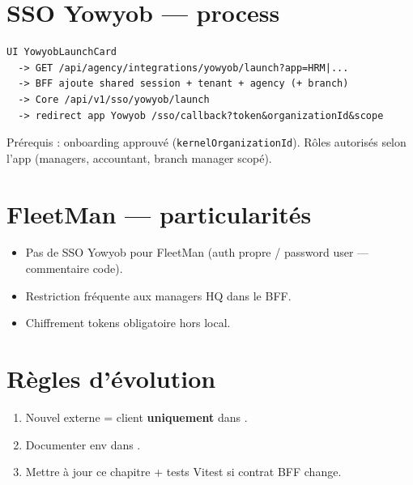 \section{SSO Yowyob --- process}

\begin{lstlisting}
UI YowyobLaunchCard
  -> GET /api/agency/integrations/yowyob/launch?app=HRM|...
  -> BFF ajoute shared session + tenant + agency (+ branch)
  -> Core /api/v1/sso/yowyob/launch
  -> redirect app Yowyob /sso/callback?token&organizationId&scope
\end{lstlisting}

Prérequis : onboarding approuvé (\texttt{kernelOrganizationId}). Rôles autorisés
selon l'app (managers, accountant, branch manager scopé).

\section{FleetMan --- particularités}

\begin{itemize}
  \item Pas de SSO Yowyob pour FleetMan (auth propre / password user --- commentaire code).
  \item Restriction fréquente aux managers HQ dans le BFF.
  \item Chiffrement tokens obligatoire hors local.
\end{itemize}

\section{Règles d'évolution}

\begin{enumerate}
  \item Nouvel externe = client \textbf{uniquement} dans .
  \item Documenter env dans .
  \item Mettre à jour ce chapitre + tests Vitest si contrat BFF change.
\end{enumerate}
